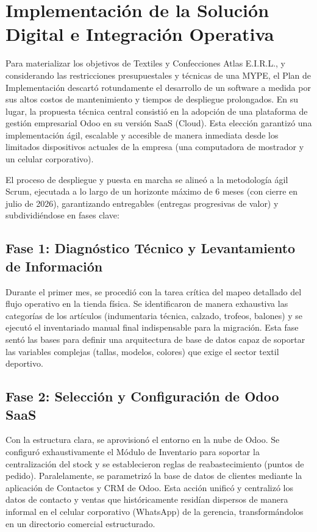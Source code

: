 \section{Implementación de la Solución Digital e Integración Operativa}

Para materializar los objetivos de Textiles y Confecciones Atlas E.I.R.L., y considerando las restricciones presupuestales y técnicas de una MYPE, el Plan de Implementación descartó rotundamente el desarrollo de un software a medida por sus altos costos de mantenimiento y tiempos de despliegue prolongados. En su lugar, la propuesta técnica central consistió en la adopción de una plataforma de gestión empresarial Odoo en su versión SaaS (Cloud). Esta elección garantizó una implementación ágil, escalable y accesible de manera inmediata desde los limitados dispositivos actuales de la empresa (una computadora de mostrador y un celular corporativo). 

El proceso de despliegue y puesta en marcha se alineó a la metodología ágil Scrum, ejecutada a lo largo de un horizonte máximo de 6 meses (con cierre en julio de 2026), garantizando entregables (entregas progresivas de valor) y subdividiéndose en fases clave:

\subsection{Fase 1: Diagnóstico Técnico y Levantamiento de Información}
Durante el primer mes, se procedió con la tarea crítica del mapeo detallado del flujo operativo en la tienda física. Se identificaron de manera exhaustiva las categorías de los artículos (indumentaria técnica, calzado, trofeos, balones) y se ejecutó el inventariado manual final indispensable para la migración. Esta fase sentó las bases para definir una arquitectura de base de datos capaz de soportar las variables complejas (tallas, modelos, colores) que exige el sector textil deportivo.

\subsection{Fase 2: Selección y Configuración de Odoo SaaS}
Con la estructura clara, se aprovisionó el entorno en la nube de Odoo. Se configuró exhaustivamente el Módulo de Inventario para soportar la centralización del stock y se establecieron reglas de reabastecimiento (puntos de pedido). Paralelamente, se parametrizó la base de datos de clientes mediante la aplicación de Contactos y CRM de Odoo. Esta acción unificó y centralizó los datos de contacto y ventas que históricamente residían dispersos de manera informal en el celular corporativo (WhatsApp) de la gerencia, transformándolos en un directorio comercial estructurado.

